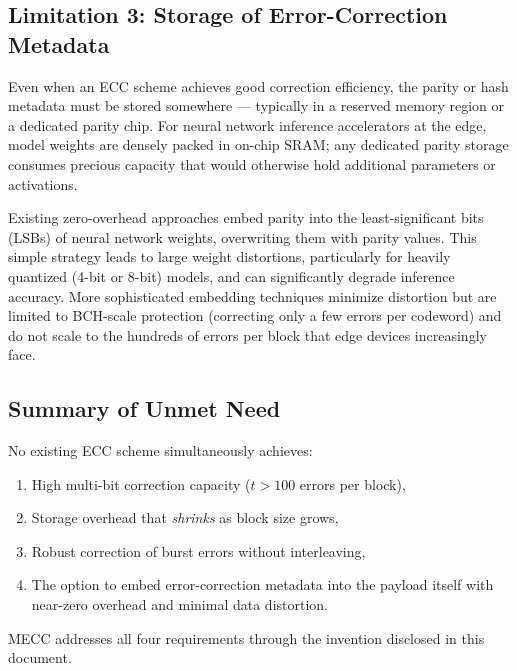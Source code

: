 \subsection*{Limitation 3: Storage of Error-Correction Metadata}

Even when an ECC scheme achieves good correction efficiency, the parity or hash metadata must be stored somewhere --- typically in a reserved memory region or a dedicated parity chip.
For neural network inference accelerators at the edge, model weights are densely packed in on-chip SRAM; any dedicated parity storage consumes precious capacity that would otherwise hold additional parameters or activations.

Existing zero-overhead approaches embed parity into the least-significant bits (LSBs) of neural network weights, overwriting them with parity values.
This simple strategy leads to large weight distortions, particularly for heavily quantized (4-bit or 8-bit) models, and can significantly degrade inference accuracy.
More sophisticated embedding techniques minimize distortion but are limited to BCH-scale protection (correcting only a few errors per codeword) and do not scale to the hundreds of errors per block that edge devices increasingly face.

\subsection*{Summary of Unmet Need}

No existing ECC scheme simultaneously achieves:
\begin{enumerate}
    \item High multi-bit correction capacity ($t > 100$ errors per block),
    \item Storage overhead that \emph{shrinks} as block size grows,
    \item Robust correction of burst errors without interleaving,
    \item The option to embed error-correction metadata into the payload itself with near-zero overhead and minimal data distortion.
\end{enumerate}

MECC addresses all four requirements through the invention disclosed in this document.
